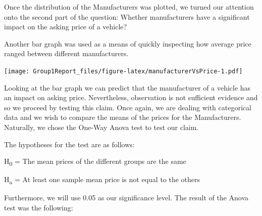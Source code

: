\documentclass[
]{article}
\newenvironment{Shaded}{\begin{snugshade}}{\end{snugshade}}
\newcommand{\AttributeTok}[1]{\textcolor[rgb]{0.77,0.63,0.00}{#1}}
\newcommand{\DecValTok}[1]{\textcolor[rgb]{0.00,0.00,0.81}{#1}}
\newcommand{\FunctionTok}[1]{\textcolor[rgb]{0.00,0.00,0.00}{#1}}
\newcommand{\NormalTok}[1]{#1}
\newcommand{\OtherTok}[1]{\textcolor[rgb]{0.56,0.35,0.01}{#1}}
\newcommand{\SpecialCharTok}[1]{\textcolor[rgb]{0.00,0.00,0.00}{#1}}
\newcommand{\StringTok}[1]{\textcolor[rgb]{0.31,0.60,0.02}{#1}}
\begin{document}
Once the distribution of the Manufacturers was plotted, we turned our
attention onto the second part of the question: Whether manufacturers
have a significant impact on the asking price of a vehicle?

Another bar graph was used as a means of quickly inspecting how average
price ranged between different manufacturers.

\begin{Shaded}
\end{Shaded}

\texttt{[image: Group1Report\_files/figure-latex/manufacturerVsPrice-1.pdf]}

Looking at the bar graph we can predict that the manufacturer of a
vehicle has an impact on asking price. Nevertheless, observation is not
sufficient evidence and so we proceed by testing this claim. Once again,
we are dealing with categorical data and we wish to compare the means of
the prices for the Manufacturers. Naturally, we chose the One-Way Anova
test to test our claim.

The hypotheses for the test are as follows:

H\textsubscript{0} = The mean prices of the different groups are the
same

H\textsubscript{a} = At least one sample mean price is not equal to the
others

Furthermore, we will use 0.05 as our significance level. The result of
the Anova test was the following:
\end{document}
